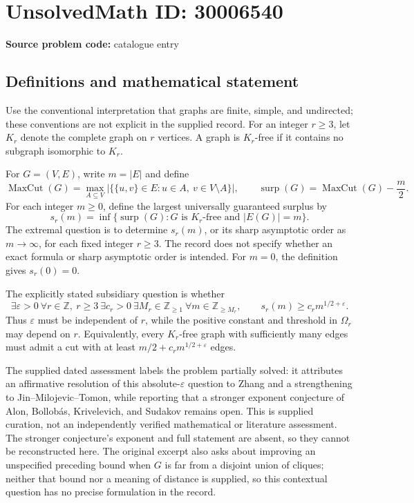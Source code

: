 \documentclass[11pt]{article}
\newcommand{\Z}{\mathbb{Z}}
\begin{document}
\section*{UnsolvedMath ID: 30006540}
\textbf{Source problem code:} catalogue entry
\subsection{Definitions and mathematical statement}
Use the conventional interpretation that graphs are finite, simple, and undirected; these conventions are not explicit in the supplied record. For an integer \(r\geq 3\), let \(K_r\) denote the complete graph on \(r\) vertices. A graph is \(K_r\)-free if it contains no subgraph isomorphic to \(K_r\).

For \(G=(V,E)\), write \(m=|E|\) and define
\[
\operatorname{MaxCut}(G)=\max_{A\subseteq V}\bigl|\{\{u,v\}\in E:u\in A,\ v\in V\setminus A\}\bigr|,
\qquad
\operatorname{surp}(G)=\operatorname{MaxCut}(G)-\frac m2.
\]
For each integer \(m\geq 0\), define the largest universally guaranteed surplus by
\[
s_r(m)=\inf\{\operatorname{surp}(G):G\text{ is }K_r\text{-free and }|E(G)|=m\}.
\]
The extremal question is to determine \(s_r(m)\), or its sharp asymptotic order as \(m\to\infty\), for each fixed integer \(r\geq 3\). The record does not specify whether an exact formula or sharp asymptotic order is intended. For \(m=0\), the definition gives \(s_r(0)=0\).

The explicitly stated subsidiary question is whether
\[
\exists\varepsilon>0\ \forall r\in\Z,\ r\geq 3\ \exists c_r>0\ \exists M_r\in\Z_{\geq 1}\ \forall m\in\Z_{\geq M_r},
\qquad s_r(m)\geq c_r m^{1/2+\varepsilon}.
\]
Thus \(\varepsilon\) must be independent of \(r\), while the positive constant and threshold in \(\Omega_r\) may depend on \(r\). Equivalently, every \(K_r\)-free graph with sufficiently many edges must admit a cut with at least \(m/2+c_r m^{1/2+\varepsilon}\) edges.

The supplied dated assessment labels the problem partially solved: it attributes an affirmative resolution of this absolute-\(\varepsilon\) question to Zhang and a strengthening to Jin--Milojevic--Tomon, while reporting that a stronger exponent conjecture of Alon, Bollob\'as, Krivelevich, and Sudakov remains open. This is supplied curation, not an independently verified mathematical or literature assessment. The stronger conjecture's exponent and full statement are absent, so they cannot be reconstructed here. The original excerpt also asks about improving an unspecified preceding bound when \(G\) is far from a disjoint union of cliques; neither that bound nor a meaning of distance is supplied, so this contextual question has no precise formulation in the record.
\end{document}
